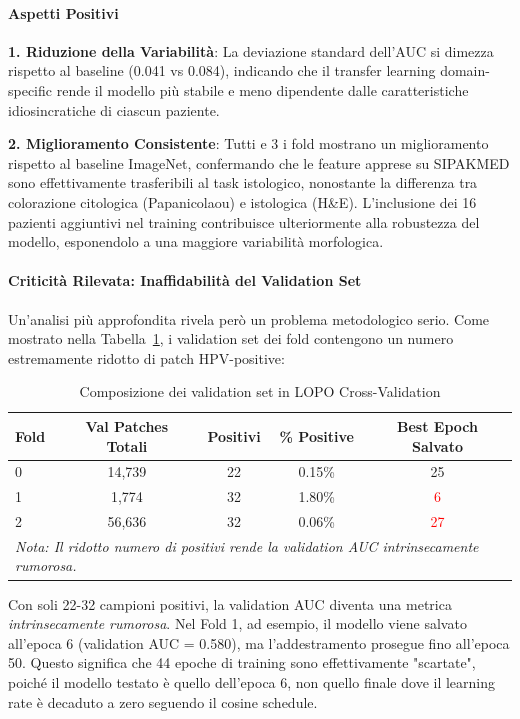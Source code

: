 	\paragraph{Aspetti Positivi}
	\textbf{1. Riduzione della Variabilità}: La deviazione standard dell'AUC si dimezza rispetto al baseline (0.041 vs 0.084), indicando che il transfer learning domain-specific rende il modello più stabile e meno dipendente dalle caratteristiche idiosincratiche di ciascun paziente.
	
	\textbf{2. Miglioramento Consistente}: Tutti e 3 i fold mostrano un miglioramento rispetto al baseline ImageNet, confermando che le feature apprese su SIPAKMED sono effettivamente trasferibili al task istologico, nonostante la differenza tra colorazione citologica (Papanicolaou) e istologica (H\&E). L'inclusione dei 16 pazienti aggiuntivi nel training contribuisce ulteriormente alla robustezza del modello, esponendolo a una maggiore variabilità morfologica.
	
	\paragraph{Criticità Rilevata: Inaffidabilità del Validation Set}
	Un'analisi più approfondita rivela però un problema metodologico serio. Come mostrato nella Tabella~\ref{tab:val_set_composition}, i validation set dei fold contengono un numero estremamente ridotto di patch HPV-positive:
	
	\begin{table}[h]
		\centering
		\caption{Composizione dei validation set in LOPO Cross-Validation}
		\label{tab:val_set_composition}
		\begin{tabular}{lcccc}
			\toprule
			\textbf{Fold} & \textbf{Val Patches Totali} & \textbf{Positivi} & \textbf{\% Positive} & \textbf{Best Epoch Salvato} \\
			\midrule
			0 & 14,739 & 22 & 0.15\% & 25 \\
			1 & 1,774 & 32 & 1.80\% & \textcolor{red}{6} \\
			2 & 56,636 & 32 & 0.06\% & \textcolor{red}{27} \\
			\bottomrule
			\multicolumn{5}{l}{\footnotesize \textit{Nota: Il ridotto numero di positivi rende la validation AUC intrinsecamente rumorosa.}}
		\end{tabular}
	\end{table}
	
	Con soli 22-32 campioni positivi, la validation AUC diventa una metrica \textit{intrinsecamente rumorosa}. Nel Fold 1, ad esempio, il modello viene salvato all'epoca 6 (validation AUC = 0.580), ma l'addestramento prosegue fino all'epoca 50. Questo significa che 44 epoche di training sono effettivamente "scartate", poiché il modello testato è quello dell'epoca 6, non quello finale dove il learning rate è decaduto a zero seguendo il cosine schedule.
	

